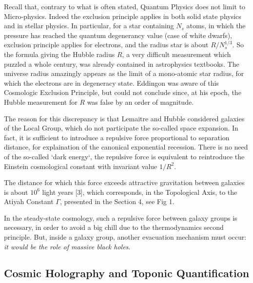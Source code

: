 \documentclass[twoside,draft]{article}
\begin{document}
\begin{sloppypar}
{Recall that, contrary to what is often stated, Quantum Physics does not limit to Micro-physics.
Indeed the exclusion principle applies in both solid state physics and in stellar physics. In particular,
for a star containing $N_s$ atoms, in which the pressure has reached the quantum degenerancy value
(case of white dwarfs), exclusion principle applies for electrons, and the radius star is about $R/N_{s}^{1/3}$.
So the formula giving the Hubble radius $R$, a very difficult measurement which puzzled a whole
century, was already contained in astrophysics textbooks. The universe radius amazingly appears as
the limit of a mono-atomic star radius, for which the electrons are in degeneracy state. Eddingon was
aware of this Cosmologic Exclusion Principle, but could not conclude since, at his epoch, the
Hubble measurement for $R$ was false by an order of magnitude.

The reason for this discrepancy is that Lemaitre and Hubble considered galaxies of the Local
Group, which do not participate the so-called space expansion. In fact, it is sufficient to introduce a
repulsive force proportional to separation distance, for explaination of the canonical
exponential recession. There is no need of the so-called `dark energy`, the repulsive force is equivalent
to reintroduce the Einstein cosmological constant with invariant value $1/R^{2}$. 

The distance for which this force exceeds attractive
gravitation between galaxies is about $10^{6}$ light years [3], which corresponds, in the Topological
Axis, to the Atiyah Constant $\Gamma$, presented in the Section 4, see Fig 1.

In the steady-state cosmology, such a repulsive force between galaxy groups is necessary, in
order to avoid a big chill due to the thermodynamics second principle. But, inside a galaxy group,
another evacuation mechanism must occur: \textit{it would be the role of massive black holes}.

\subsection{Cosmic Holography and Toponic Quantification}

}
\end{sloppypar}
\end{document}
